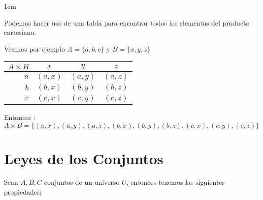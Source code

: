 \documentclass[12pt, fleqn]{report}                             %
\newenvironment{SmallIndentation}[1][0.75em]                    %
    {\begin{adjustwidth}{#1}{}\begin{footnotesize}}                 %
    {\end{footnotesize}\end{adjustwidth}}                           %
\begin{document}
                \begin{SmallIndentation}[1em]
                    
                    Podemos hacer uso de una tabla para encontrar todos los elementos del producto
                    cartesiano.

                    Veamos por ejemplo $A = \{a, b, c\}$ y $B = \{ x, y, z\}$

                    \begin{tabular}{r ||c |c | c  }
                       $A \times B$ & $x$ & $y$ & $z$ \\
                       \midrule
                      
                       $a$ &  $(a, x)$  &  $(a, y)$  &  $(a, z)$  \\
                       $b$ &  $(b, x)$  &  $(b, y)$  &  $(b, z)$  \\
                       $c$ &  $(c, x)$  &  $(c, y)$  &  $(c, z)$  \\
                     
                    \end{tabular}

                    Entonces : 
                    \begin{equation*}
                        A \times B = 
                        \{
                            (a, x) , (a, y) , (a, z) ,
                            (b, x) , (b, y) , (b, z) ,
                            (c, x) , (c, y) , (c, z) 
                        \}
                    \end{equation*}

                \end{SmallIndentation}
                    


        \clearpage
        \section{Leyes de los Conjuntos}
                
            Sean $A, B, C$ conjuntos de un universo $U$, entonces tenemos las siguientes propiedades:
\end{document}
